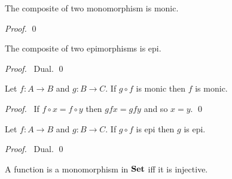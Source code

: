 \begin{prop}
    The composite of two monomorphism is monic.
\end{prop}

\begin{proof}
    \pf
    \qed
\end{proof}

\begin{prop}
    The composite of two epimorphisms is epi.
\end{prop}

\begin{proof}
    \pf\ Dual. \qed
\end{proof}

\begin{prop}
    Let $f : A \rightarrow B$ and $g : B \rightarrow C$. If $g \circ f$ is monic then $f$ is monic.
\end{prop}

\begin{proof}
    \pf\ If $f \circ x = f \circ y$ then $gfx = gfy$ and so $x = y$. \qed
\end{proof}

\begin{prop}
    Let $f : A \rightarrow B$ and $g : B \rightarrow C$. If $g \circ f$ is epi then $g$ is epi.
\end{prop}

\begin{proof}
    \pf\ Dual. \qed
\end{proof}

\begin{prop}
    A function is a monomorphism in $\mathbf{Set}$ iff it is injective.
\end{prop}

